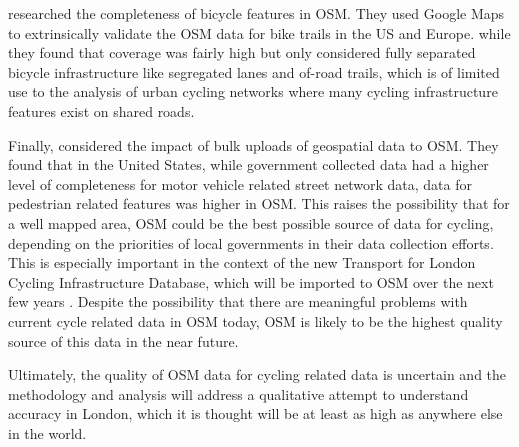 \cite{hochmair2013assessing} researched the completeness of bicycle features in OSM. They used Google Maps to extrinsically validate the OSM data for bike trails in the US and Europe. while they found that coverage was fairly high but only considered fully separated bicycle infrastructure like segregated lanes and of-road trails, which is of limited use to the analysis of urban cycling networks where many cycling infrastructure features exist on shared roads. 

Finally, \cite{zielstra2013assessing} considered the impact of bulk uploads of geospatial data to OSM. They found that in the United States, while government collected data had a higher level of completeness for motor vehicle related street network data, data for pedestrian related features was higher in OSM. This raises the possibility that for a well mapped area, OSM could be the best possible source of data for cycling, depending on the priorities of local governments in their data collection efforts. This is especially important in the context of the new Transport for London Cycling Infrastructure Database, which will be imported to OSM over the next few years \cite{tflcid}. Despite the possibility that there are meaningful problems with current cycle related data in OSM today, OSM is likely to be the highest quality source of this data in the near future. 

Ultimately, the quality of OSM data for cycling related data is uncertain and the methodology and analysis will address a qualitative attempt to understand accuracy in London, which it is thought will be at least as high as anywhere else in the world. 
